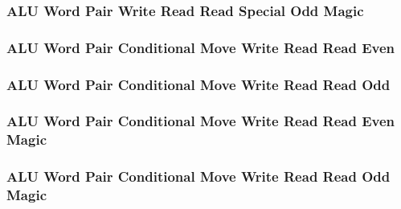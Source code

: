 \subsubsection[{\small ALU Word Pair Write Read Read Special Odd Magic}]{ALU Word Pair Write Read Read Special Odd Magic} \label{sec:format-ALU-WPWRRSO.M}



\subsubsection[{\small ALU Word Pair Conditional Move Write Read Read Even}]{ALU Word Pair Conditional Move Write Read Read Even} \label{sec:format-ALU-WPCMWRRE}



\subsubsection[{\small ALU Word Pair Conditional Move Write Read Read Odd}]{ALU Word Pair Conditional Move Write Read Read Odd} \label{sec:format-ALU-WPCMWRRO}



\subsubsection[{\small ALU Word Pair Conditional Move Write Read Read Even Magic}]{ALU Word Pair Conditional Move Write Read Read Even Magic} \label{sec:format-ALU-WPCMWRRE.M}



\subsubsection[{\small ALU Word Pair Conditional Move Write Read Read Odd Magic}]{ALU Word Pair Conditional Move Write Read Read Odd Magic} \label{sec:format-ALU-WPCMWRRO.M}




